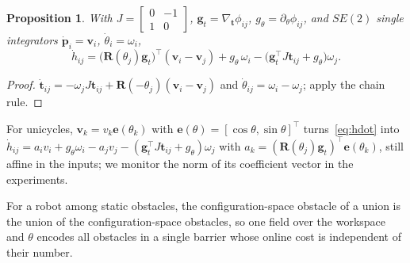 \documentclass[journal]{IEEEtran}
\newtheorem{proposition}{Proposition}
\theoremstyle{definition}
\newcommand{\Rot}{\mathbf{R}}
\begin{document}
\begin{proposition}\label{prop:hdot}
With $J=\left[\begin{smallmatrix}0&-1\\1&0\end{smallmatrix}\right]$,
$\mathbf g_t=\nabla_{\mathbf t}\phi_{ij}$, $g_\theta=\partial_\theta\phi_{ij}$, and
$SE(2)$ single integrators $\dot{\mathbf p}_i=\mathbf v_i$, $\dot\theta_i=\omega_i$,
\begin{equation}\label{eq:hdot}
\dot h_{ij}=\big(\Rot(\theta_j)\mathbf g_t\big)^{\!\top}(\mathbf v_i-\mathbf v_j)
+g_\theta\,\omega_i-\big(\mathbf g_t^{\top}J\mathbf t_{ij}+g_\theta\big)\omega_j .
\end{equation}
\end{proposition}
\begin{proof}
$\dot{\mathbf t}_{ij}=-\omega_jJ\mathbf t_{ij}+\Rot(-\theta_j)(\mathbf v_i-\mathbf v_j)$ and
$\dot\theta_{ij}=\omega_i-\omega_j$; apply the chain rule.
\end{proof}
For unicycles, $\mathbf v_k=v_k\mathbf e(\theta_k)$ with $\mathbf e(\theta)=[\cos\theta,\sin\theta]^\top$
turns~\eqref{eq:hdot} into $\dot h_{ij}=a_iv_i+g_\theta\omega_i-a_jv_j-(\mathbf g_t^\top J\mathbf
t_{ij}+g_\theta)\omega_j$ with $a_k=(\Rot(\theta_j)\mathbf g_t)^\top\mathbf e(\theta_k)$, still affine
in the inputs; we monitor the norm of its coefficient vector in the experiments.

For a robot among static obstacles, the configuration-space obstacle of a union is the union of the
configuration-space obstacles, so one field over the workspace and $\theta$ encodes all obstacles in
a single barrier whose online cost is independent of their number.
\end{document}
